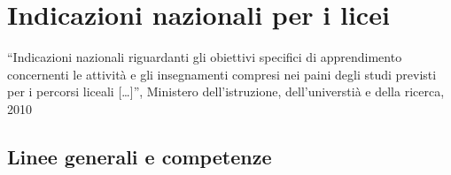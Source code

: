 \documentclass[letterpaper,10pt,english]{jupyterBook}
\begin{document}
\sphinxstepscope


\section{Indicazioni nazionali per i licei}
\label{\detokenize{ch/school-programs/current-guidelines-italy:indicazioni-nazionali-per-i-licei}}\label{\detokenize{ch/school-programs/current-guidelines-italy::doc}}
\sphinxAtStartPar
“Indicazioni nazionali riguardanti gli obiettivi specifici di apprendimento concernenti le attività e gli insegnamenti compresi nei paini degli studi previsti per i percorsi liceali {[}…{]}”, Ministero dell’istruzione, dell’universtià e della ricerca, 2010


\subsection{Linee generali e competenze}
\end{document}
